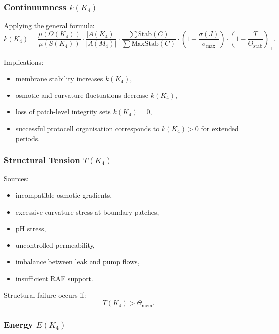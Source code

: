 \subsubsection{Continuumness \texorpdfstring{$k(K_4)$}{k(K_4)}}

Applying the general formula:
\[
k(K_4) = 
\frac{\mu(\Omega(K_4))}{\mu(S(K_4))}
\cdot
\frac{|A(K_4)|}{|A(M_4)|}
\cdot
\frac{\sum \mathrm{Stab}(C)}{\sum \mathrm{MaxStab}(C)}
\cdot
(1 - \frac{\sigma(J)}{\sigma_{\max}})
\cdot
(1 - \frac{T}{\Theta_{\mathrm{stab}}})_+.
\]

Implications:
\begin{itemize}
    \item membrane stability increases $k(K_4)$,
    \item osmotic and curvature fluctuations decrease $k(K_4)$,
    \item loss of patch-level integrity sets $k(K_4)=0$,
    \item successful protocell organisation corresponds to
          $k(K_4)>0$ for extended periods.
\end{itemize}

\subsubsection{Structural Tension \texorpdfstring{$T(K_4)$}{T(K_4)}}

Sources:
\begin{itemize}
    \item incompatible osmotic gradients,
    \item excessive curvature stress at boundary patches,
    \item pH stress,
    \item uncontrolled permeability,
    \item imbalance between leak and pump flows,
    \item insufficient RAF support.
\end{itemize}

Structural failure occurs if:
\[
T(K_4) > \Theta_{\mathrm{mem}}.
\]

\subsubsection{Energy \texorpdfstring{$E(K_4)$}{E(K_4)}}

